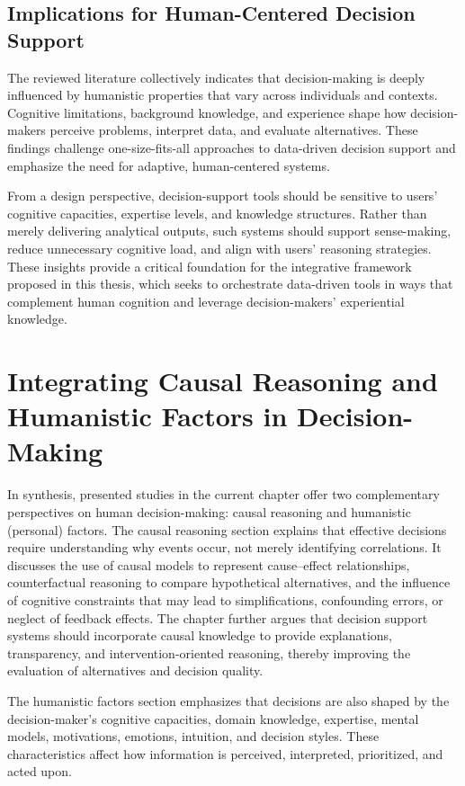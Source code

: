\documentclass{sfuthesis}
\begin{document}
\subsection{Implications for Human-Centered Decision Support}
The reviewed literature collectively indicates that decision-making is deeply influenced by humanistic properties that vary across individuals and contexts. Cognitive limitations, background knowledge, and experience shape how decision-makers perceive problems, interpret data, and evaluate alternatives. These findings challenge one-size-fits-all approaches to data-driven decision support and emphasize the need for adaptive, human-centered systems.\par
From a design perspective, decision-support tools should be sensitive to users’ cognitive capacities, expertise levels, and knowledge structures. Rather than merely delivering analytical outputs, such systems should support sense-making, reduce unnecessary cognitive load, and align with users’ reasoning strategies. These insights provide a critical foundation for the integrative framework proposed in this thesis, which seeks to orchestrate data-driven tools in ways that complement human cognition and leverage decision-makers’ experiential knowledge.

\section{Integrating Causal Reasoning and Humanistic Factors in Decision-Making}
In synthesis, presented studies in the current chapter offer two complementary perspectives on human decision-making: causal reasoning and humanistic (personal) factors. The causal reasoning section explains that effective decisions require understanding why events occur, not merely identifying correlations. It discusses the use of causal models to represent cause–effect relationships, counterfactual reasoning to compare hypothetical alternatives, and the influence of cognitive constraints that may lead to simplifications, confounding errors, or neglect of feedback effects. The chapter further argues that decision support systems should incorporate causal knowledge to provide explanations, transparency, and intervention-oriented reasoning, thereby improving the evaluation of alternatives and decision quality.

The humanistic factors section emphasizes that decisions are also shaped by the decision-maker’s cognitive capacities, domain knowledge, expertise, mental models, motivations, emotions, intuition, and decision styles. These characteristics affect how information is perceived, interpreted, prioritized, and acted upon.
\end{document}
